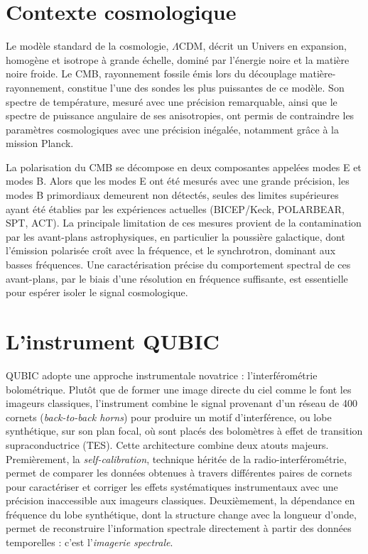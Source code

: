 \section*{Contexte cosmologique}

Le modèle standard de la cosmologie, $\Lambda$CDM, décrit un Univers en expansion, homogène et isotrope à grande échelle, dominé par l'énergie noire et la matière noire froide. Le CMB, rayonnement fossile émis lors du découplage matière-rayonnement, constitue l'une des sondes les plus puissantes de ce modèle. Son spectre de température, mesuré avec une précision remarquable, ainsi que le spectre de puissance angulaire de ses anisotropies, ont permis de contraindre les paramètres cosmologiques avec une précision inégalée, notamment grâce à la mission Planck.

La polarisation du CMB se décompose en deux composantes appelées modes E et modes B. Alors que les modes E ont été mesurés avec une grande précision, les modes B primordiaux demeurent non détectés, seules des limites supérieures ayant été établies par les expériences actuelles (BICEP/Keck, POLARBEAR, SPT, ACT). La principale limitation de ces mesures provient de la contamination par les avant-plans astrophysiques, en particulier la poussière galactique, dont l'émission polarisée croît avec la fréquence, et le synchrotron, dominant aux basses fréquences. Une caractérisation précise du comportement spectral de ces avant-plans, par le biais d'une résolution en fréquence suffisante, est essentielle pour espérer isoler le signal cosmologique.

\section*{L'instrument QUBIC}

QUBIC adopte une approche instrumentale novatrice : l'interférométrie bolométrique. Plutôt que de former une image directe du ciel comme le font les imageurs classiques, l'instrument combine le signal provenant d'un réseau de 400 cornets (\emph{back-to-back horns}) pour produire un motif d'interférence, ou lobe synthétique, sur son plan focal, où sont placés des bolomètres à effet de transition supraconductrice (TES). Cette architecture combine deux atouts majeurs. Premièrement, la \emph{self-calibration}, technique héritée de la radio-interférométrie, permet de comparer les données obtenues à travers différentes paires de cornets pour caractériser et corriger les effets systématiques instrumentaux avec une précision inaccessible aux imageurs classiques. Deuxièmement, la dépendance en fréquence du lobe synthétique, dont la structure change avec la longueur d'onde, permet de reconstruire l'information spectrale directement à partir des données temporelles : c'est l'\emph{imagerie spectrale}.

